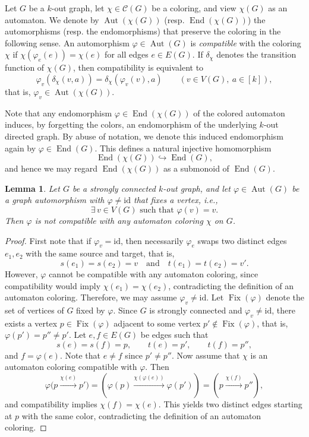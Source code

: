 \documentclass[a4paper,10pt]{amsart}
\theoremstyle{plain}
\newtheorem{lemma}[theorem]{Lemma}
\theoremstyle{definition}
\DeclareMathOperator{\Aut}{Aut}
\DeclareMathOperator{\Fix}{Fix}
\DeclareMathOperator{\End}{End}
\newcommand{\id}{\mathrm{id}}
\begin{document}
Let $G$ be a $k$-out graph, let $\chi\in\mathcal C(G)$ be a coloring, and view $\chi(G)$ as an automaton. We denote by  $\Aut(\chi(G))$ (resp. $\End(\chi(G))$) the automorphisms (resp. the endomorphisms) that preserve the coloring in the following sense. 
An automorphism $\varphi\in \Aut(G)$ is \emph{compatible} with the coloring $\chi$ if $\chi(\varphi_e(e))=\chi(e)$ for all edges $e\in E(G)$. 
If $\delta_\chi$ denotes the transition function of $\chi(G)$, then compatibility is equivalent to
\[
\varphi_v(\delta_\chi(v,a))=\delta_\chi(\varphi_v(v),a)
\qquad (v\in V(G),\ a\in[k]),
\]
that is, $\varphi_v\in \Aut(\chi(G))$.

Note that any endomorphism $\varphi \in \End(\chi(G))$ of the colored automaton induces, by forgetting the colors, an endomorphism of the underlying
$k$-out directed graph. By abuse of notation, we denote this induced
endomorphism again by $\varphi \in \End(G)$. This defines a natural injective
homomorphism
\[
\End(\chi(G)) \hookrightarrow \End(G),
\]
and hence we may regard $\End(\chi(G))$ as a submonoid of $\End(G)$.

\begin{lemma}\label{lem: nec condition compatibility}
Let $G$ be a strongly connected $k$-out graph, and let
$\varphi \in \Aut(G)$ be a graph automorphism with $\varphi \neq \id$
that fixes a vertex, i.e.,
\[
\exists\, v \in V(G) \text{ such that } \varphi(v) = v .
\]
Then $\varphi$ is not compatible with any automaton coloring $\chi$ on $G$.
\end{lemma}
\begin{proof}
First note that if $\varphi_v = \id$, then necessarily $\varphi_e$ swaps two
distinct edges $e_1,e_2$ with the same source and target, that is,
\[
s(e_1)=s(e_2)=v
\quad\text{and}\quad
t(e_1)=t(e_2)=v'.
\]
However, $\varphi$ cannot be compatible with any automaton coloring, since
compatibility would imply $\chi(e_1)=\chi(e_2)$, contradicting the definition
of an automaton coloring. Therefore, we may assume $\varphi_v \neq \id$.
Let $\Fix(\varphi)$ denote the set of vertices of $G$ fixed by $\varphi$.
Since $G$ is strongly connected and $\varphi_{v} \neq \id$, there exists a vertex
$p \in \Fix(\varphi)$ adjacent to some vertex $p' \notin \Fix(\varphi)$, that is, $\varphi(p')=p''\neq p'$.
Let $e,f \in E(G)$ be edges such that
\[
s(e)=s(f)=p,
\qquad
t(e)=p',
\qquad
t(f)=p'',
\]
and $f=\varphi(e)$. Note that $e \neq f$ since $p' \neq p''$. Now assume that $\chi$ is an automaton coloring compatible with $\varphi$.
Then
\[
\varphi\bigl(p \xrightarrow{\chi(e)} p'\bigr)
=
\left(\varphi(p) \xrightarrow{\chi(\varphi(e))} \varphi(p')\right)
=
\left(p \xrightarrow{\chi(f)} p''\right),
\]
and compatibility implies $\chi(f)=\chi(e)$. This yields two distinct edges
starting at $p$ with the same color, contradicting the definition of an
automaton coloring.
\end{proof}
\end{document}
